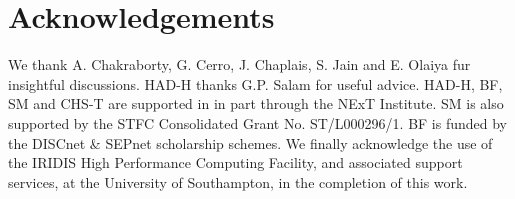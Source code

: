 \documentclass[12pt]{article}
\begin{document}
    \section{Acknowledgements}
We thank A. Chakraborty, 
G. Cerro, 
J. Chaplais, 
S. Jain and 
E. Olaiya fur insightful discussions. HAD-H thanks
G.P. Salam for useful advice. 
HAD-H, BF, SM and CHS-T are supported in  in part through the NExT Institute.
SM is also supported by the STFC Consolidated
Grant No. ST/L000296/1. BF is funded by the DISCnet \& SEPnet scholarship schemes.
We finally 
acknowledge the use of the IRIDIS High Performance Computing Facility, and associated
support services, at the University of Southampton, in the completion of this work.

\printbibliography
\end{document}

